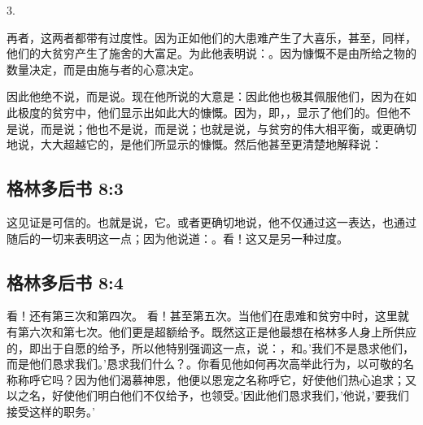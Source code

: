 3. \par

再者，这两者都带有过度性。因为正如他们的大患难产生了大喜乐，甚至，同样，他们的大贫穷产生了施舍的大富足。为此他表明说：。因为慷慨不是由所给之物的数量决定，而是由施与者的心意决定。\par

因此他绝不说，而是说。现在他所说的大意是：因此他也极其佩服他们，因为在如此极度的贫穷中，他们显示出如此大的慷慨。因为，即，，显示了他们的。但他不是说，而是说；他也不是说，而是说；也就是说，与贫穷的伟大相平衡，或更确切地说，大大超越它的，是他们所显示的慷慨。然后他甚至更清楚地解释说：\par


\subsection{格林多后书 8:3}

这见证是可信的。也就是说，它。或者更确切地说，他不仅通过这一表达，也通过随后的一切来表明这一点；因为他说道：。看！这又是另一种过度。\par


\subsection{格林多后书 8:4}

 看！还有第三次和第四次。 看！甚至第五次。当他们在患难和贫穷中时，这里就有第六次和第七次。他们更是超额给予。既然这正是他最想在格林多人身上所供应的，即出于自愿的给予，所以他特别强调这一点，说：，和。'我们不是恳求他们，而是他们恳求我们。'恳求我们什么？。你看见他如何再次高举此行为，以可敬的名称称呼它吗？因为他们渴慕神恩，他便以恩宠之名称呼它，好使他们热心追求；又以之名，好使他们明白他们不仅给予，也领受。'因此他们恳求我们，'他说，'要我们接受这样的职务。'\par

